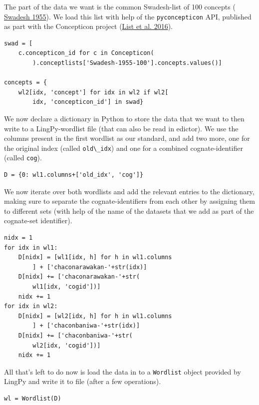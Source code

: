\documentclass[
  english,
  a4paper,
  oneside,tablecaptionabove
]{scrbook}
\newcommand{\passthrough}[1]{#1}
\begin{document}
\leavevmode\hypertarget{markdown}{}%
The part of the data we want is the common Swadesh-list of 100 concepts
( \href{http://bibliography.lingpy.org?key=Swadesh1955}{Swadesh 1955}).
We load this list with help of the
\passthrough{\lstinline!pyconcepticon!} API, published as part with the
Concepticon project (\href{http://bibliography.lingpy.org?key=List2016a}{List et al. 2016}).

\begin{lstlisting}
swad = [
    c.concepticon_id for c in Concepticon(
        ).conceptlists['Swadesh-1955-100'].concepts.values()]

concepts = {
    wl2[idx, 'concept'] for idx in wl2 if wl2[
        idx, 'concepticon_id'] in swad}
\end{lstlisting}

\leavevmode\hypertarget{markdown}{}%
We now declare a dictionary in Python to store the data that we want to
then write to a LingPy-wordlist file (that can also be read in edictor).
We use the columns present in the first wordlist as our standard, and
add two more, one for the original index (called
\passthrough{\lstinline!old\_idx!}) and one for a combined
cognate-identifier (called \passthrough{\lstinline!cog!}).

\begin{lstlisting}
D = {0: wl1.columns+['old_idx', 'cog']}
\end{lstlisting}

We now iterate over both wordlists and add the relevant entries to the
dictionary, making sure to separate the cognate-identifiers from each
other by assigning them to different sets (with help of the name of the
datasets that we add as part of the cognate-set identifier).

\begin{lstlisting}
nidx = 1
for idx in wl1:
    D[nidx] = [wl1[idx, h] for h in wl1.columns
        ] + ['chaconarawakan-'+str(idx)]
    D[nidx] += ['chaconarawakan-'+str(
        wl1[idx, 'cogid'])]
    nidx += 1
for idx in wl2:
    D[nidx] = [wl2[idx, h] for h in wl1.columns
        ] + ['chaconbaniwa-'+str(idx)]
    D[nidx] += ['chaconbaniwa-'+str(
        wl2[idx, 'cogid'])]
    nidx += 1
\end{lstlisting}

All that's left to do now is load the data in to a
\passthrough{\lstinline!Wordlist!} object provided by LingPy and write
it to file (after a few operations).

\begin{lstlisting}
wl = Wordlist(D)
\end{lstlisting}
\end{document}
